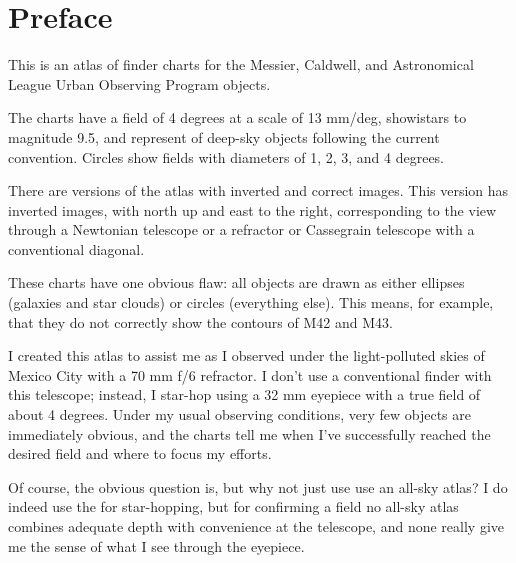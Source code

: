 
\chapter*{Preface}

This is an atlas of finder charts for the Messier, Caldwell, and Astronomical League Urban Observing Program objects. 

The charts have a field of 4 degrees at a scale of 13 mm/deg, showistars to magnitude 9.5, and represent of deep-sky objects following the current convention. Circles show fields with diameters of 1, 2, 3, and 4 degrees.

There are versions of the atlas with inverted and correct images. This version has inverted images, with north up and east to the right, corresponding to the view through a Newtonian telescope or a refractor or Cassegrain telescope with a conventional diagonal.

These charts have one obvious flaw: all objects are drawn as either ellipses (galaxies and star clouds) or circles (everything else). This means, for example, that they do not correctly show the contours of M42 and M43.

I created this atlas to assist me as I observed under the light-polluted skies of Mexico City with a 70 mm f/6 refractor. I don't use a conventional finder with this telescope; instead, I star-hop using a 32 mm eyepiece with a true field of about 4 degrees. Under my usual observing conditions, very few objects are immediately obvious, and the charts tell me when I've successfully reached the desired field and where to focus my efforts.

Of course, the obvious question is, but why not just use use an all-sky atlas? I do indeed use the {\PSA} for star-hopping, but for confirming a field no all-sky atlas combines adequate depth with convenience at the telescope, and none really give me the sense of what I see through the eyepiece.


